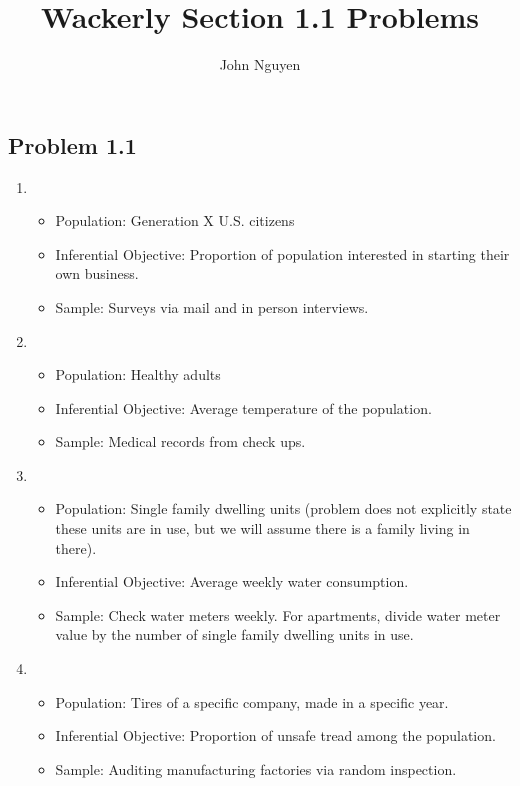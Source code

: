 \documentclass[12pt]{article}
\title{Wackerly Section 1.1 Problems}
\author{John Nguyen}
\begin{document}
\maketitle

\subsection*{Problem 1.1}
    \begin{enumerate}[label=(\alph*).]
        \item 
        \begin{itemize}
            \item Population: Generation X U.S. citizens
            \item Inferential Objective: Proportion of population interested in starting their own business.
            \item Sample: Surveys via mail and in person interviews.
        \end{itemize}
        
        \item 
        \begin{itemize}
            \item Population: Healthy adults
            \item Inferential Objective: Average temperature of the population.
            \item Sample: Medical records from check ups.
        \end{itemize}
        
        \item 
        \begin{itemize}
            \item Population: Single family dwelling units (problem does not explicitly state these units are in use, but we will assume there is a family living in there).
            \item Inferential Objective: Average weekly water consumption.
            \item Sample: Check water meters weekly. For apartments, divide water meter value by the number of single family dwelling units in use.
        \end{itemize}
        
        \item 
        \begin{itemize}
            \item Population: Tires of a specific company, made in a specific year.
            \item Inferential Objective: Proportion of unsafe tread among the population.
            \item Sample: Auditing manufacturing factories via random inspection.
        \end{itemize}
        

\end{enumerate}
\end{document}
